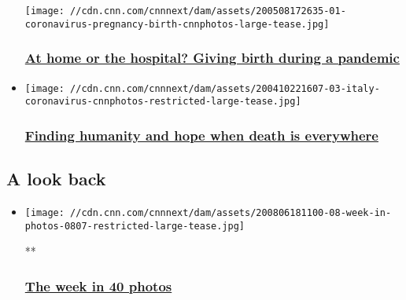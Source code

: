 \begin{itemize}
  \texttt{[image: //cdn.cnn.com/cnnnext/dam/assets/200508172635-01-coronavirus-pregnancy-birth-cnnphotos-large-tease.jpg]}

  \hypertarget{at-home-or-the-hospital-giving-birth-during-a-pandemic}{%
  \subsubsection{\texorpdfstring{\href{https://www.cnn.com/interactive/2020/05/health/coronavirus-pregnancy-birth-cnnphotos/index.html}{At
  home or the hospital? Giving birth during a
  pandemic}}{At home or the hospital? Giving birth during a pandemic}}\label{at-home-or-the-hospital-giving-birth-during-a-pandemic}}
\item
  \href{https://www.cnn.com/interactive/2020/04/world/italy-coronavirus-cnnphotos/index.html}{}

  \texttt{[image: //cdn.cnn.com/cnnnext/dam/assets/200410221607-03-italy-coronavirus-cnnphotos-restricted-large-tease.jpg]}

  \hypertarget{finding-humanity-and-hope-when-death-is-everywhere}{%
  \subsubsection{\texorpdfstring{\href{https://www.cnn.com/interactive/2020/04/world/italy-coronavirus-cnnphotos/index.html}{Finding
  humanity and hope when death is
  everywhere}}{Finding humanity and hope when death is everywhere}}\label{finding-humanity-and-hope-when-death-is-everywhere}}
\end{itemize}

\hypertarget{a-look-back-}{%
\subsection{A look back~}\label{a-look-back-}}

\begin{itemize}
\item
  \href{/2020/08/06/world/gallery/photos-this-week-july-30-august-6/index.html}{}

  \texttt{[image: //cdn.cnn.com/cnnnext/dam/assets/200806181100-08-week-in-photos-0807-restricted-large-tease.jpg]}

  **

  \hypertarget{the-week-in-40-photos}{%
  \subsubsection{\texorpdfstring{\href{/2020/08/06/world/gallery/photos-this-week-july-30-august-6/index.html}{The
  week in 40
  photos}}{The week in 40 photos}}\label{the-week-in-40-photos}}
\end{itemize}


